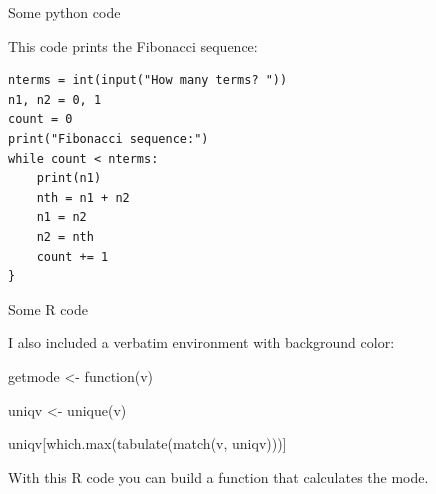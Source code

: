 
\begin{frame}[fragile]{Some python code}

This code prints the Fibonacci sequence:

\begin{verbatim}
nterms = int(input("How many terms? "))
n1, n2 = 0, 1
count = 0
print("Fibonacci sequence:")
while count < nterms:
    print(n1)
    nth = n1 + n2
    n1 = n2
    n2 = nth
    count += 1
}
\end{verbatim}

\end{frame}


\begin{frame}[fragile]{Some R code}

I also included a verbatim environment with background color:

\begin{cverbatim}
getmode <- function(v) {
  
  uniqv <- unique(v)
  
  uniqv[which.max(tabulate(match(v, uniqv)))]
  
}
\end{cverbatim}

With this R code you can build a function that calculates the mode.

\end{frame}



















